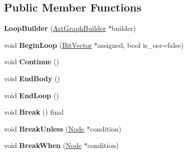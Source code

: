 \subsection*{Public Member Functions}
\begin{DoxyCompactItemize}
\item 
{\bfseries Loop\+Builder} (\hyperlink{classv8_1_1internal_1_1compiler_1_1_ast_graph_builder}{Ast\+Graph\+Builder} $\ast$builder)\hypertarget{classv8_1_1internal_1_1compiler_1_1_loop_builder_a75cb9cef29edb86866e6dd19552677a6}{}\label{classv8_1_1internal_1_1compiler_1_1_loop_builder_a75cb9cef29edb86866e6dd19552677a6}

\item 
void {\bfseries Begin\+Loop} (\hyperlink{classv8_1_1internal_1_1_bit_vector}{Bit\+Vector} $\ast$assigned, bool is\+\_\+osr=false)\hypertarget{classv8_1_1internal_1_1compiler_1_1_loop_builder_aedafca472ea013a1b9a6b1443729e329}{}\label{classv8_1_1internal_1_1compiler_1_1_loop_builder_aedafca472ea013a1b9a6b1443729e329}

\item 
void {\bfseries Continue} ()\hypertarget{classv8_1_1internal_1_1compiler_1_1_loop_builder_a647b1232b6c991cc56eebeaa1f7d683e}{}\label{classv8_1_1internal_1_1compiler_1_1_loop_builder_a647b1232b6c991cc56eebeaa1f7d683e}

\item 
void {\bfseries End\+Body} ()\hypertarget{classv8_1_1internal_1_1compiler_1_1_loop_builder_a458575350e746561172a01d7fa1e6183}{}\label{classv8_1_1internal_1_1compiler_1_1_loop_builder_a458575350e746561172a01d7fa1e6183}

\item 
void {\bfseries End\+Loop} ()\hypertarget{classv8_1_1internal_1_1compiler_1_1_loop_builder_a72e86ecc730a0642d80728a027008b3b}{}\label{classv8_1_1internal_1_1compiler_1_1_loop_builder_a72e86ecc730a0642d80728a027008b3b}

\item 
void {\bfseries Break} () final\hypertarget{classv8_1_1internal_1_1compiler_1_1_loop_builder_a1fb1902e8a5de2e1038aa169166e622b}{}\label{classv8_1_1internal_1_1compiler_1_1_loop_builder_a1fb1902e8a5de2e1038aa169166e622b}

\item 
void {\bfseries Break\+Unless} (\hyperlink{classv8_1_1internal_1_1compiler_1_1_node}{Node} $\ast$condition)\hypertarget{classv8_1_1internal_1_1compiler_1_1_loop_builder_a76ca2cfe5f2b427d9d13a4106204d853}{}\label{classv8_1_1internal_1_1compiler_1_1_loop_builder_a76ca2cfe5f2b427d9d13a4106204d853}

\item 
void {\bfseries Break\+When} (\hyperlink{classv8_1_1internal_1_1compiler_1_1_node}{Node} $\ast$condition)\hypertarget{classv8_1_1internal_1_1compiler_1_1_loop_builder_a0928cc9873054d2cfe63ed14aa260af1}{}\label{classv8_1_1internal_1_1compiler_1_1_loop_builder_a0928cc9873054d2cfe63ed14aa260af1}

\end{DoxyCompactItemize}
